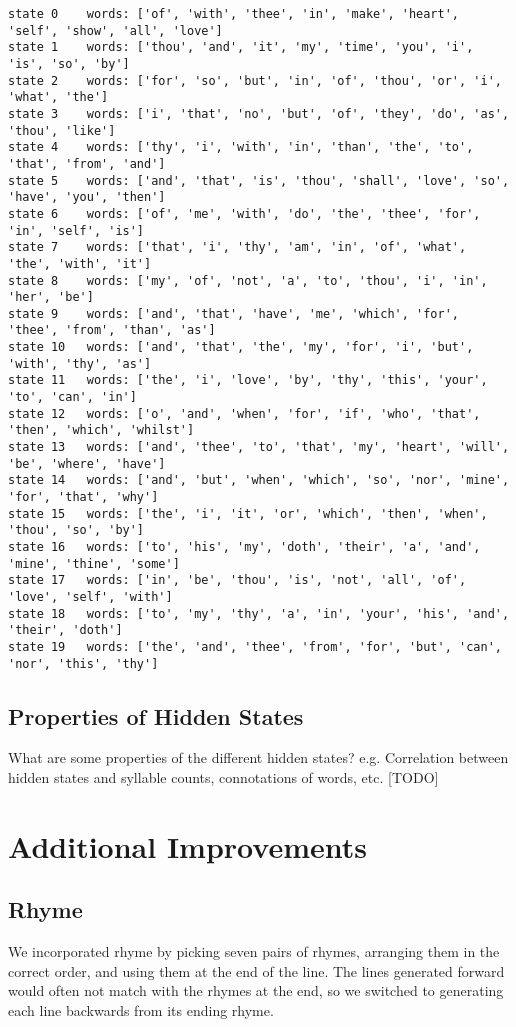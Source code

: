 \begin{lstlisting}[mathescape]
state 0    words: ['of', 'with', 'thee', 'in', 'make', 'heart', 'self', 'show', 'all', 'love']
state 1    words: ['thou', 'and', 'it', 'my', 'time', 'you', 'i', 'is', 'so', 'by']
state 2    words: ['for', 'so', 'but', 'in', 'of', 'thou', 'or', 'i', 'what', 'the']
state 3    words: ['i', 'that', 'no', 'but', 'of', 'they', 'do', 'as', 'thou', 'like']
state 4    words: ['thy', 'i', 'with', 'in', 'than', 'the', 'to', 'that', 'from', 'and']
state 5    words: ['and', 'that', 'is', 'thou', 'shall', 'love', 'so', 'have', 'you', 'then']
state 6    words: ['of', 'me', 'with', 'do', 'the', 'thee', 'for', 'in', 'self', 'is']
state 7    words: ['that', 'i', 'thy', 'am', 'in', 'of', 'what', 'the', 'with', 'it']
state 8    words: ['my', 'of', 'not', 'a', 'to', 'thou', 'i', 'in', 'her', 'be']
state 9    words: ['and', 'that', 'have', 'me', 'which', 'for', 'thee', 'from', 'than', 'as']
state 10   words: ['and', 'that', 'the', 'my', 'for', 'i', 'but', 'with', 'thy', 'as']
state 11   words: ['the', 'i', 'love', 'by', 'thy', 'this', 'your', 'to', 'can', 'in']
state 12   words: ['o', 'and', 'when', 'for', 'if', 'who', 'that', 'then', 'which', 'whilst']
state 13   words: ['and', 'thee', 'to', 'that', 'my', 'heart', 'will', 'be', 'where', 'have']
state 14   words: ['and', 'but', 'when', 'which', 'so', 'nor', 'mine', 'for', 'that', 'why']
state 15   words: ['the', 'i', 'it', 'or', 'which', 'then', 'when', 'thou', 'so', 'by']
state 16   words: ['to', 'his', 'my', 'doth', 'their', 'a', 'and', 'mine', 'thine', 'some']
state 17   words: ['in', 'be', 'thou', 'is', 'not', 'all', 'of', 'love', 'self', 'with']
state 18   words: ['to', 'my', 'thy', 'a', 'in', 'your', 'his', 'and', 'their', 'doth']
state 19   words: ['the', 'and', 'thee', 'from', 'for', 'but', 'can', 'nor', 'this', 'thy']
\end{lstlisting}

\subsection{Properties of Hidden States}
What are some properties of the different hidden states?
e.g. Correlation between hidden states and syllable counts, connotations of words, etc.
[TODO]


\section{Additional Improvements}
\subsection{Rhyme}
We incorporated rhyme by picking seven pairs of rhymes, arranging them in the correct order, and using them at the end of the line. The lines generated forward would often not match with the rhymes at the end, so we switched to generating each line backwards from its ending rhyme.
